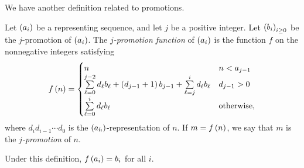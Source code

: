 \documentclass[english,12pt]{article}
\newcommand{\seq}{\p}
\begin{document}
We have another definition related to promotions.
\begin{defin}\label{def:promofun}
Let $\seq{a_i}$ be a representing sequence, and let $j$ be a positive integer.  Let $\seq{b_i}_{i\geq0}$ be the $j$-promotion of $\seq{a_i}$.  The \emph{$j$-promotion function} of $\seq{a_i}$ is the function $f$ on the nonnegative integers satisfying
\[
f\left(n\right)=
\begin{cases}
n & n < a_{j-1}\\
\sum\limits_{\ell=0}^{j-2}d_\ell b_\ell+\left(d_{j-1}+1\right)b_{j-1}+\sum\limits_{\ell=j}^{i}d_\ell b_\ell & d_{j-1}>0\\
\sum\limits_{\ell=0}^{i}d_\ell b_\ell & \text{otherwise},
\end{cases}
\]
where $d_{i}d_{i-1}\cdots d_0$ is the $\seq{a_h}$-representation of $n$.  If $m=f\left(n\right)$, we say that $m$ is the \emph{$j$-promotion} of $n$.
\end{defin}
Under this definition, $f\left(a_i\right)=b_i$ for all $i$.
\end{document}
